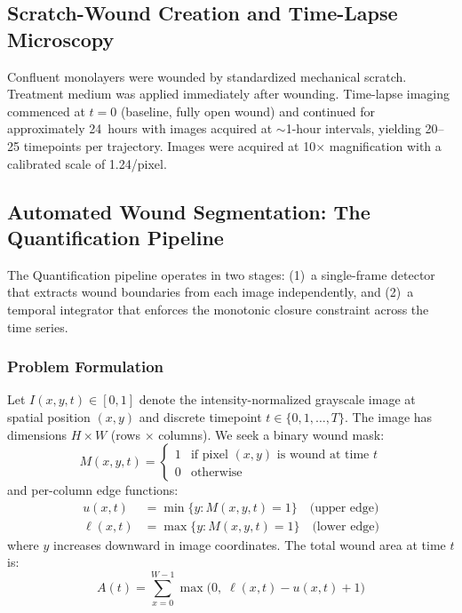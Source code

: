 \subsection{Scratch-Wound Creation and Time-Lapse Microscopy}

Confluent monolayers were wounded by standardized mechanical scratch. Treatment medium was applied immediately after wounding. Time-lapse imaging commenced at $t = 0$ (baseline, fully open wound) and continued for approximately 24~hours with images acquired at $\sim$1-hour intervals, yielding 20--25 timepoints per trajectory. Images were acquired at 10$\times$ magnification with a calibrated scale of 1.24\um/pixel.

\subsection{Automated Wound Segmentation: The Quantification Pipeline}

The Quantification pipeline operates in two stages: (1)~a single-frame detector that extracts wound boundaries from each image independently, and (2)~a temporal integrator that enforces the monotonic closure constraint across the time series.

\subsubsection{Problem Formulation}

Let $I(x, y, t) \in [0, 1]$ denote the intensity-normalized grayscale image at spatial position $(x, y)$ and discrete timepoint $t \in \{0, 1, \ldots, T\}$. The image has dimensions $H \times W$ (rows $\times$ columns). We seek a binary wound mask:
\begin{equation}
  M(x, y, t) = \begin{cases} 1 & \text{if pixel } (x, y) \text{ is wound at time } t \\ 0 & \text{otherwise} \end{cases}
\end{equation}
and per-column edge functions:
\begin{align}
  u(x, t) &= \min\{y : M(x, y, t) = 1\} \quad \text{(upper edge)} \\
  \ell(x, t) &= \max\{y : M(x, y, t) = 1\} \quad \text{(lower edge)}
\end{align}
where $y$ increases downward in image coordinates. The total wound area at time $t$ is:
\begin{equation}
  A(t) = \sum_{x=0}^{W-1} \max\bigl(0,\; \ell(x,t) - u(x,t) + 1\bigr)
\end{equation}

